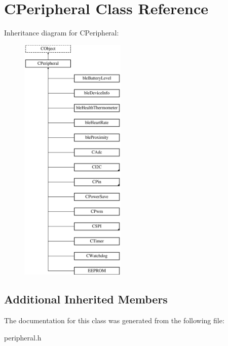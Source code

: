 \hypertarget{class_c_peripheral}{\section{C\-Peripheral Class Reference}
\label{class_c_peripheral}
}
Inheritance diagram for C\-Peripheral\-:\begin{figure}[H]
\begin{center}
\leavevmode
\includegraphics[height=12.000000cm]{class_c_peripheral}
\end{center}
\end{figure}
\subsection*{Additional Inherited Members}


The documentation for this class was generated from the following file\-:\begin{DoxyCompactItemize}
\item 
peripheral.\-h\end{DoxyCompactItemize}
